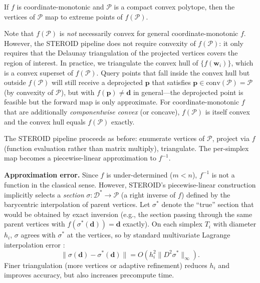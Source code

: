 \documentclass[review,onefignum,onetabnum]{./SIAM_template/siamart171218}
\begin{document}
\begin{proposition}
	\label{prop:nonlinear}
	If $f$ is coordinate-monotonic and $\mathcal{P}$ is a compact convex polytope, then
	the vertices of $\mathcal{P}$ map to extreme points of $f(\mathcal{P})$.
\end{proposition}

Note that $f(\mathcal{P})$ is \emph{not} necessarily convex for general
coordinate-monotonic $f$.  However, the STEROID pipeline does not require convexity
of $f(\mathcal{P})$: it only requires that the Delaunay triangulation of the projected
vertices covers the region of interest.  In practice, we triangulate the convex hull
of $\{f(\mathbf{w}_i)\}$, which is a convex superset of $f(\mathcal{P})$.  Query points
that fall inside the convex hull but outside $f(\mathcal{P})$ will still receive a
deprojected $\mathbf{p}$ that satisfies $\mathbf{p} \in \mathrm{conv}(\mathcal{P})
	= \mathcal{P}$ (by convexity of $\mathcal{P}$), but with $f(\mathbf{p}) \neq \mathbf{d}$
in general---the deprojected point is feasible but the forward map is only approximate.
For coordinate-monotonic $f$ that are additionally \emph{componentwise convex} (or
concave), $f(\mathcal{P})$ is itself convex and the convex hull equals $f(\mathcal{P})$
exactly.

The STEROID pipeline proceeds as before: enumerate vertices of $\mathcal{P}$, project
via $f$ (function evaluation rather than matrix multiply), triangulate.  The per-simplex
map becomes a piecewise-linear approximation to $f^{-1}$.

\textbf{Approximation error.}  Since $f$ is under-determined ($m < n$), $f^{-1}$ is
not a function in the classical sense.  However, STEROID's piecewise-linear
construction implicitly selects a \emph{section} $\sigma: \mathcal{D}^* \to
	\mathcal{P}$ (a right inverse of $f$) defined by the barycentric interpolation
of parent vertices.  Let $\sigma^*$ denote the ``true'' section that would be
obtained by exact inversion (e.g., the section passing through the same parent
vertices with $f(\sigma^*(\mathbf{d})) = \mathbf{d}$ exactly).  On each simplex
$T_i$ with diameter $h_i$, $\sigma$ agrees with $\sigma^*$ at the vertices, so by
standard multivariate Lagrange interpolation error \cite{Ciarlet2002}:
\begin{equation}
	\label{eq:error_bound}
	\|\sigma(\mathbf{d}) - \sigma^*(\mathbf{d})\|
	= O\!\left(h_i^2 \|D^2 \sigma^*\|_\infty\right).
\end{equation}
Finer triangulation (more vertices or adaptive refinement) reduces $h_i$ and
improves accuracy, but also increases precompute time.
\end{document}
